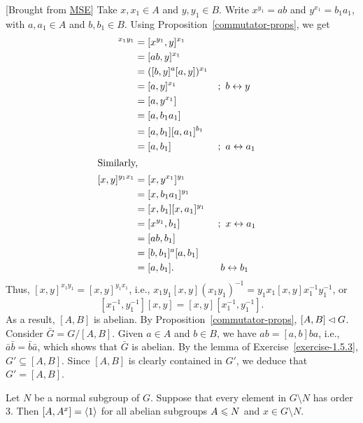 \begin{solution} {[Brought from \href{https://math.stackexchange.com/q/3488256}{MSE}]} Take $x,x_1\in A$ and $y,y_1\in B$. Write $x^{y_1}=ab$ and $y^{x_1}=b_1a_1$, with $a,a_1\in A$ and $b,b_1\in B$. Using Proposition~\ref{commutator-props}, we get
\begin{align*}
    [x,y]^{x_1y_1} &= [x^{y_1},y]^{x_1}\\
        &= [ab,y]^{x_1}\\
        &= ([b,y]^a[a,y])^{x_1}\\
        &= [a,y]^{x_1}    &&;\ b\leftrightarrow y\\
        &= [a,y^{x_1}]\\
        &= [a,b_1a_1]\\
        &= [a,b_1][a,a_1]^{b_1}\\
        &= [a,b_1]  &&;\ a\leftrightarrow a_1\\
    \intertext{Similarly,}
    [x,y]^{y_1x_1} &= [x,y^{x_1}]^{y_1}\\
        &= [x,b_1a_1]^{y_1}\\
        &= [x,b_1][x,a_1]^{y_1}\\
        &= [x^{y_1},b_1]  &&;\ x\leftrightarrow a_1\\
        &= [ab,b_1]\\
        &= [b,b_1]^a[a,b_1]\\
        &= [a,b_1].  &&\; b\leftrightarrow b_1
\end{align*}
Thus, $[x,y]^{x_1y_1}=[x,y]^{y_1x_1}$, i.e., $x_1y_1[x,y](x_1y_1)^{-1}=y_1x_1[x,y]x_1^{-1}y_1^{-1}$, or
$$
    [x_1^{-1},y_1^{-1}][x,y]=[x,y][x_1^{-1},y_1^{-1}].
$$
As a result, $[A,B]$ is abelian. By Proposition~\ref{commutator-props}, $[A,B]\lhd G$. Consider $\bar G=G/[A,B]$. Given $a\in A$ and $b\in B$, we have $ab=[a,b]ba$, i.e., $\bar a\bar b=\bar b\bar a$, which shows that $\bar G$ is abelian. By the lemma of Exercise~\ref{exercise-1.5.3}, $G'\subseteq[A,B]$. Since $[A,B]$ is clearly contained in $G'$, we deduce that $G'=[A,B]$.  \end{solution}

\begin{exr} \textrm{\upshape[Burnside]}
    Let\/ $N$ be a normal subgroup of\/ $G$. Suppose that every element in\/ $G\setminus N$ has order\/~$3$. Then\/ $[A,A^x]=\langle1\rangle$ for all abelian subgroups\/ $A\leqslant N$ and\/ $x\in G\setminus N$.
\end{exr}

